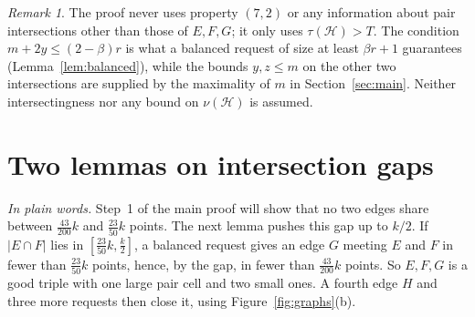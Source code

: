 \documentclass[11pt]{amsart}
\theoremstyle{definition}
\theoremstyle{remark}
\newtheorem{remark}[theorem]{Remark}
\newcommand{\cH}{\mathcal H}
\begin{document}
\begin{remark}
The proof never uses property $(7,2)$ or any information about pair intersections other than those of $E,F,G$; it only uses $\tau(\cH)>T$. The condition $m+2y\le(2-\beta)r$ is what a balanced request of size at least $\beta r+1$ guarantees (Lemma~\ref{lem:balanced}), while the bounds $y,z\le m$ on the other two intersections are supplied by the maximality of $m$ in Section~\ref{sec:main}. Neither intersectingness nor any bound on $\nu(\cH)$ is assumed.
\end{remark}

\section{Two lemmas on intersection gaps}\label{sec:gap}

\noindent\emph{In plain words.} Step~1 of the main proof will show that no two edges share between $\frac{43}{200}k$ and $\frac{23}{50}k$ points. The next lemma pushes this gap up to $k/2$. If $|E\cap F|$ lies in $[\frac{23}{50}k,\frac k2]$, a balanced request gives an edge $G$ meeting $E$ and $F$ in fewer than $\frac{23}{50}k$ points, hence, by the gap, in fewer than $\frac{43}{200}k$ points. So $E,F,G$ is a good triple with one large pair cell and two small ones. A fourth edge $H$ and three more requests then close it, using Figure~\ref{fig:graphs}(b).
\end{document}
